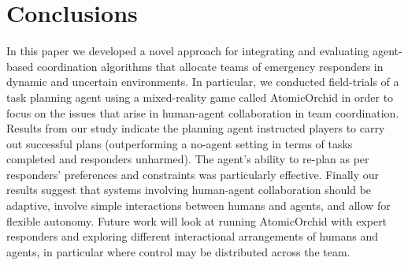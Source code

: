 \section{Conclusions}\label{sec:conclusions}
\noindent In this paper we developed a novel approach for integrating and evaluating agent-based coordination algorithms that allocate teams of emergency responders in dynamic and uncertain environments.  In particular, we conducted field-trials of a task planning agent using a mixed-reality game  called AtomicOrchid in order to focus on the issues that arise in human-agent collaboration in team coordination. Results from our study indicate  the planning agent instructed players to carry out successful plans (outperforming a no-agent setting in terms of tasks completed and responders unharmed). The agent's ability to re-plan  as per responders' preferences and constraints was particularly effective. Finally our results  suggest that systems involving human-agent collaboration should be adaptive, involve simple  interactions between humans and agents, and allow for flexible autonomy. Future work will look at running AtomicOrchid with expert responders and  exploring different interactional arrangements of humans and agents, in particular where control may be distributed across the team.\vspace{-1mm}